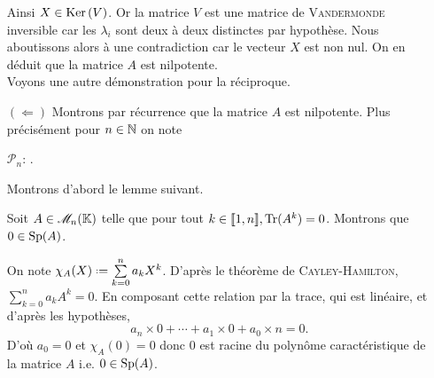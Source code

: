\begin{preuve}
\begin{itemize}

        Ainsi $X \in \mathrm{Ker}\,(V)$. Or la matrice $V$ est une matrice de \textsc{Vandermonde} inversible car les $\lambda_i$ sont deux à deux distinctes par hypothèse. Nous aboutissons alors à une contradiction car le vecteur $X$ est non nul. On en déduit que la matrice $A$ est nilpotente. \\
        
        Voyons une autre démonstration pour la réciproque. \\ 
        \item[$(\Leftarrow)$] Montrons par récurrence que la matrice $A$ est nilpotente. Plus précisément pour $n \in \mathbb{N}$ on note
        \begin{center}
            $\mathscr{P}_n$: .
        \end{center}
        Montrons d'abord le lemme suivant.
        \begin{lemme}
            Soit $A \in \mathscr{M}_n(\mathbb{K})$ telle que pour tout $k \in \llbracket 1, n \rrbracket, \mathrm{Tr}(A^k) = 0$. Montrons que $0 \in \mathrm{Sp}(A)$.
        \end{lemme}
        On note $\chi_A(X) \defeq \sum\limits_{k=0}^n a_k X^k$. D'après le théorème de \textsc{Cayley}-\textsc{Hamilton}, $\sum\limits_{k=0}^n a_k A^k = 0$. En composant cette relation par la trace, qui est linéaire, et d'après les hypothèses, 
        $$a_n \times 0 + \cdots + a_1 \times 0 + a_0 \times n = 0.$$
        D'où $a_0 = 0$ et $\chi_A(0) = 0$ donc $0$ est racine du polynôme caractéristique de la matrice $A$ i.e. $0 \in \mathrm{Sp}(A)$. \\
        

\end{itemize}
\end{preuve}
